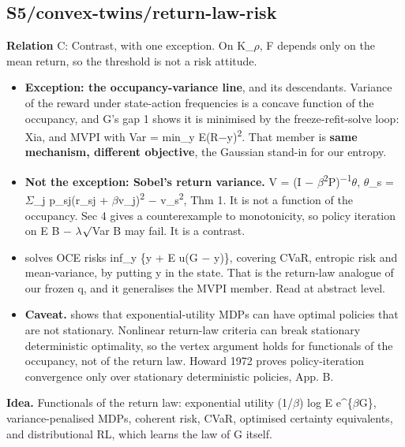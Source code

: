 \documentclass[10pt]{article}
\begin{document}
\subsection{S5/convex-twins/return-law-risk}\label{node:S5-S5-convex-twins-return-law-risk}
\textbf{Relation} \textsf{C}: Contrast, with one exception. On K\_\ensuremath{\rho}, F depends only on the mean return, so the threshold is not a risk attitude.
\begin{itemize}[nosep,leftmargin=1.2em]
\item \textbf{Exception: the occupancy-variance line}, \citet{Filar-variance89} and its descendants. Variance of the reward under state-action frequencies is a concave function of the occupancy, and G's gap 1 shows it is minimised by the freeze-refit-solve loop: Xia, and MVPI with Var = min\_y E(R\ensuremath{-}y)\textsuperscript{2}. That member is \textbf{same mechanism, different objective}, the Gaussian stand-in for our entropy.
\item \textbf{Not the exception: Sobel's return variance.} V = (I \ensuremath{-} \ensuremath{\beta}\textsuperscript{2}P)\textsuperscript{$-$}\textsuperscript{1}\ensuremath{\theta}, \ensuremath{\theta}\_s = \ensuremath{\Sigma}\_j p\_sj(r\_sj + \ensuremath{\beta}v\_j)\textsuperscript{2} \ensuremath{-} v\_s\textsuperscript{2}, Thm 1. It is not a function of the occupancy. Sec 4 gives a counterexample to monotonicity, so policy iteration on E B \ensuremath{-} \ensuremath{\lambda}\ensuremath{\surd}Var B may fail. It is a contrast.
\item \citet{Wang-reductions24} solves OCE risks inf\_y \{y + E u(G \ensuremath{-} y)\}, covering CVaR, entropic risk and mean-variance, by putting y in the state. That is the return-law analogue of our frozen q, and it generalises the MVPI member. Read at abstract level.
\item \textbf{Caveat.} \citet{Jaquette-utility76} shows that exponential-utility MDPs can have optimal policies that are not stationary. Nonlinear return-law criteria can break stationary deterministic optimality, so the vertex argument holds for functionals of the occupancy, not of the return law. Howard 1972 proves policy-iteration convergence only over stationary deterministic policies, App. B.
\end{itemize}


\textbf{Idea.} Functionals of the return law: exponential utility (1/\ensuremath{\beta}) log E e\^{}\{\ensuremath{\beta}G\}, variance-penalised MDPs, coherent risk, CVaR, optimised certainty equivalents, and distributional RL, which learns the law of G itself.
\end{document}
